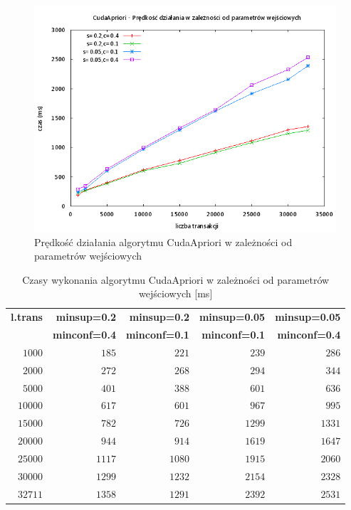 \begin{figure}[H]
\centering
\includegraphics[width=1.1\textwidth]{figures/06/capriori.png}
\caption{Prędkość działania algorytmu CudaApriori w zależności od parametrów wejściowych\label{rys:capriori}}
\end{figure}

\begin{table}
	\centering
	\begin{tabular}{r|r|r|r|r}
	\textbf{l.trans} & \textbf{minsup=0.2} & \textbf{minsup=0.2} & \textbf{minsup=0.05} & \textbf{minsup=0.05}  \\
	 & \textbf{minconf=0.4} & \textbf{minconf=0.1} & \textbf{minconf=0.1} & \textbf{minconf=0.4}  \\ \hline
	$1000$ & $185$ & $221$ & $239$ & $286$ \\
	$2000$ & $272$ & $268$ & $294$ & $344$ \\
	$5000$ & $401$ & $388$ & $601$ & $636$ \\
	$10000$ & $617$ & $601$ & $967$ & $995$ \\
	$15000$ & $782$ & $726$ & $1299$ & $1331$ \\
	$20000$ & $944$ & $914$ & $1619$ & $1647$ \\
	$25000$ & $1117$ & $1080$ & $1915$ & $2060$ \\
	$30000$ & $1299$ & $1232$ & $2154$ & $2328$ \\
	$32711$ & $1358$ & $1291$ & $2392$ & $2531$ \\
	\end{tabular}
	\caption{Czasy wykonania algorytmu CudaApriori w zależności od parametrów wejściowych [ms]\label{tab:capriori}}
\end{table}

